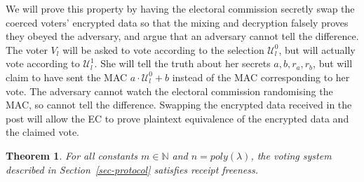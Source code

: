 \documentclass[12pt,a4paper]{article}
\newtheorem{theorem}{Theorem}
\theoremstyle{definition}
\begin{document}
We will prove this property by having the electoral commission secretly swap the coerced voters' encrypted data so that the mixing and decryption falsely proves they obeyed the adversary, and argue that an adversary cannot tell the difference. The voter $V_l$ will be asked to vote according to the selection $\mathcal{U}^0_l$, but will actually vote according to $\mathcal{U}^1_l$. She will tell the truth about her secrets $a, b, r_a, r_b$, but will claim to have sent the MAC $a\cdot\mathcal{U}^0_l+b$ instead of the MAC corresponding to her vote. The adversary cannot watch the electoral commission randomising the MAC, so cannot tell the difference. Swapping the encrypted data received in the post will allow the EC to prove plaintext equivalence of the encrypted data and the claimed vote.
\begin{theorem}\label{thm-Rec-free}
    For all constants $m \in \mathbb{N}$ and $n=poly(\lambda)$, the voting system described in Section~\ref{sec-protocol} satisfies receipt freeness.
\end{theorem}
\end{document}
